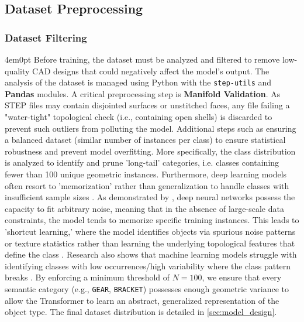 \subsection{Dataset Preprocessing}
	\subsubsection{Dataset Filtering}
		\begin{indentedblock}{4em}{0pt}
			Before training, the dataset must be analyzed and filtered to remove low-quality CAD designs that could negatively affect the model's output. The analysis of the dataset is managed using Python with the \texttt{step-utils} and \textbf{Pandas} modules. A critical preprocessing step is \textbf{Manifold Validation}. As STEP files may contain disjointed surfaces or unstitched faces, any file failing a "water-tight" topological check (i.e., containing open shells) is discarded to prevent such outliers from polluting the model. Additional steps such as ensuring a balanced dataset (similar number of instances per class) to ensure statistical robustness and prevent model overfitting. More specifically, the class distribution is analyzed to identify and prune 'long-tail' categories, i.e. classes containing fewer than 100 unique geometric instances. Furthermore, deep learning models often resort to 'memorization' rather than generalization to handle classes with insufficient sample sizes \parencite{deep_learning_goodfellow}. As demonstrated by \parencite{generalization_zhang}, deep neural networks possess the capacity to fit arbitrary noise, meaning that in the absence of large-scale data constraints, the model tends to memorize specific training instances. This leads to 'shortcut learning,' where the model identifies objects via spurious noise patterns or texture statistics rather than learning the underlying topological features that define the class \parencites{shortcut_learning_geirhos}{memorization_arpit}. Research also shows that machine learning models struggle with identifying classes with low occurrences/high variability where the class pattern breaks \parencite{memorization_effect_you}. By enforcing a minimum threshold of $N=100$, we ensure that every semantic category (e.g., \texttt{GEAR}, \texttt{BRACKET}) possesses enough geometric variance to allow the Transformer to learn an abstract, generalized representation of the object type. The final dataset distribution is detailed in \autoref{sec:model_design}.
			
			
		\end{indentedblock}


